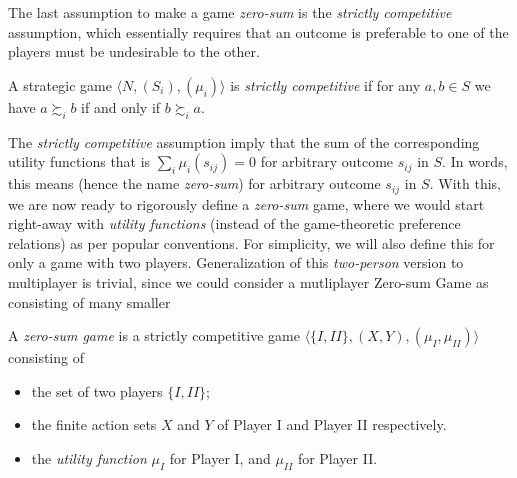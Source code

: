 \documentclass[11pt,reqno, a4]{amsart}
\begin{document}
The last assumption to make a game \textit{zero-sum} is the \textit{strictly competitive} assumption, which essentially requires that an outcome is preferable to one of the players must be undesirable to the other. 
\begin{definition}
    A strategic game $\langle N, (S_i), (\mu_i) \rangle$ is \textit{strictly competitive} if for any $a, b \in S$ we have $a \succsim_i b$ if and only if $b \succsim_i a$. 
\end{definition}
\noindent The \textit{strictly competitive} assumption imply that the sum of the corresponding utility functions that is $\sum_i \mu_i(s_{ij}) = 0$ for arbitrary outcome $s_{ij}$ in $S$. In words, this means  (hence the name \textit{zero-sum}) for arbitrary outcome $s_{ij}$ in $S$. With this, we are now ready to rigorously define a \textit{zero-sum} game, where we would start right-away with \textit{utility functions} (instead of the game-theoretic preference relations) as per popular conventions. For simplicity, we will also define this for only a game with two players. Generalization of this \textit{two-person} version to multiplayer is trivial, since we could consider a mutliplayer Zero-sum Game as consisting of many smaller
\begin{definition}
    A \textit{zero-sum game} is a strictly competitive game $\langle \{I, II\}, (X,Y), (\mu_I, \mu_{II}) \rangle$ consisting of
    \begin{itemize}
    \item the set of two players \(\{I, II\}\);
    \item the finite action sets $X$ and $Y$ of Player I and Player II respectively.
    \item the \textit{utility function} $\mu_I$ for Player I, and $\mu_{II}$ for Player II.
\end{itemize}
\end{definition}
\end{document}

